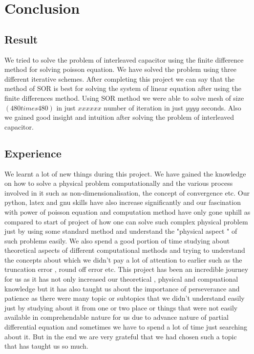 \newpage
\section{Conclusion}
\subsection{Result}
We tried to solve the problem of interleaved capacitor using the finite difference method for solving poisson equation. We have solved the problem using three different iterative schemes. After completing this project we can say that the method of SOR is best for solving the system of linear equation after using the finite differences method. Using SOR method we were able to solve mesh of size $ (480 times 480) $ in just $ xxxxxx $ number of iteration in just $  yyyy $ seconds. Also we gained good insight and intuition after solving the problem of interleaved capacitor.
\subsection{Experience}
We learnt a lot of new things during this project. We have gained the knowledge on how to solve a physical problem computationally and the various process involved in it such as non-dimensionalisation, the concept of convergence etc. Our python, latex and gnu skills have also increase significantly and our fascination with power of poisson equation and computation method have only gone uphill as compared to start of project of how one can solve such complex physical problem just by using some standard method and understand the "physical aspect " of such problems easily. We also spend a good portion of time studying about theoretical aspects of different computational methods and trying to understand the concepts about which we didn't pay a lot of attention to earlier such as the truncation error , round off error etc. This project has been an incredible journey for us as it has not only increased our theoretical , physical and compuational knowledge but it has also taught us about the importance of perseverance and patience as there were many topic or subtopics that we didn't understand easily just by studying about it from one or two place or things that were not easily available in comprehendable nature for us due to advance nature of partial differential equation and sometimes we have to spend a lot of time just searching about it. But in the end we are very grateful that we had chosen such a topic that has taught us so much. 
